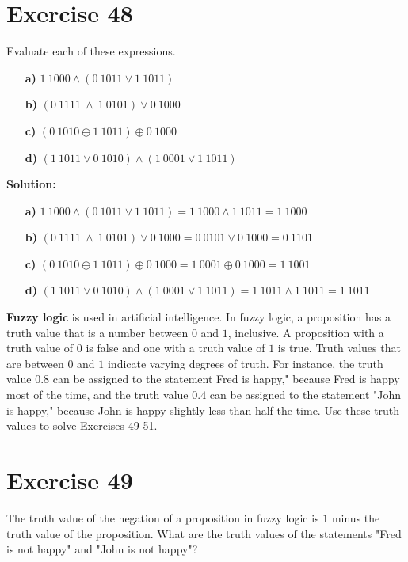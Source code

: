 \documentclass{Axon}
\begin{document}
\section*{Exercise 48}
Evaluate each of these expressions.
\begin{enumerate}
    \item[\textbf{a)}] \(1 \ 1000 \land (0 \ 1011 \lor 1 \ 1011)\)
    \item[\textbf{b)}] \((0 \ 1111 \ \land \ 1 \ 0101) \lor 0 \ 1000\)
    \item[\textbf{c)}] \((0 \ 1010 \oplus 1 \ 1011) \oplus 0 \ 1000\)
    \item[\textbf{d)}] \((1 \ 1011 \lor 0 \ 1010) \land (1 \ 0001 \lor 1 \ 1011)\)
\end{enumerate}

\noindent
\textbf{Solution:}
\begin{enumerate}
    \item[\textbf{a)}] \(1 \ 1000 \land (0 \ 1011 \lor 1 \ 1011) = 1 \ 1000 \land 1 \ 1011 = 1 \ 1000\)
    \item[\textbf{b)}] \((0 \ 1111 \ \land \ 1 \ 0101) \lor 0 \ 1000 = 0 \ 0101 \lor 0 \ 1000 = 0 \ 1101\)
    \item[\textbf{c)}] \((0 \ 1010 \oplus 1 \ 1011) \oplus 0 \ 1000 = 1 \ 0001 \oplus 0 \ 1000 = 1 \ 1001\)
    \item[\textbf{d)}] \((1 \ 1011 \lor 0 \ 1010) \land (1 \ 0001 \lor 1 \ 1011) = 1 \ 1011 \land 1 \ 1011 = 1 \ 1011\)
\end{enumerate}

\textbf{Fuzzy logic} is used in artificial intelligence. In fuzzy logic, a proposition has a truth value that is a number between \(0\) and \(1\), inclusive. A proposition with a truth value of \(0\) is false and one with a truth value of \(1\) is true. Truth values that are between \(0\) and \(1\) indicate varying degrees of truth. For instance, the truth value \(0.8\) can be assigned to the statement 
Fred is happy," because Fred is happy most of the time, and the truth value \(0.4\) can be assigned to the statement "John is happy," because John is happy slightly less than half the time. Use these truth values to solve Exercises 49-51.

\section*{Exercise 49}
The truth value of the negation of a proposition in fuzzy logic is \(1\) minus the truth value of the proposition. What are the truth values of the statements "Fred is not happy" and "John is not happy"?
\end{document}
